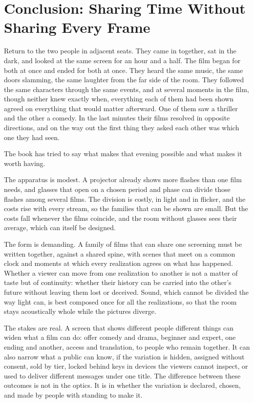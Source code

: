 \chapter*{Conclusion: Sharing Time Without Sharing Every Frame}

Return to the two people in adjacent seats. They came in together, sat in the dark, and looked at the same screen for an hour and a half. The film began for both at once and ended for both at once. They heard the same music, the same doors slamming, the same laughter from the far side of the room. They followed the same characters through the same events, and at several moments in the film, though neither knew exactly when, everything each of them had been shown agreed on everything that would matter afterward. One of them saw a thriller and the other a comedy. In the last minutes their films resolved in opposite directions, and on the way out the first thing they asked each other was which one they had seen.

The book has tried to say what makes that evening possible and what makes it worth having.

The apparatus is modest. A projector already shows more flashes than one film needs, and glasses that open on a chosen period and phase can divide those flashes among several films. The division is costly, in light and in flicker, and the costs rise with every stream, so the families that can be shown are small. But the costs fall whenever the films coincide, and the room without glasses sees their average, which can itself be designed.

The form is demanding. A family of films that can share one screening must be written together, against a shared spine, with scenes that meet on a common clock and moments at which every realization agrees on what has happened. Whether a viewer can move from one realization to another is not a matter of taste but of continuity: whether their history can be carried into the other's future without leaving them lost or deceived. Sound, which cannot be divided the way light can, is best composed once for all the realizations, so that the room stays acoustically whole while the pictures diverge.

The stakes are real. A screen that shows different people different things can widen what a film can do: offer comedy and drama, beginner and expert, one ending and another, access and translation, to people who remain together. It can also narrow what a public can know, if the variation is hidden, assigned without consent, sold by tier, locked behind keys in devices the viewers cannot inspect, or used to deliver different messages under one title. The difference between these outcomes is not in the optics. It is in whether the variation is declared, chosen, and made by people with standing to make it.

